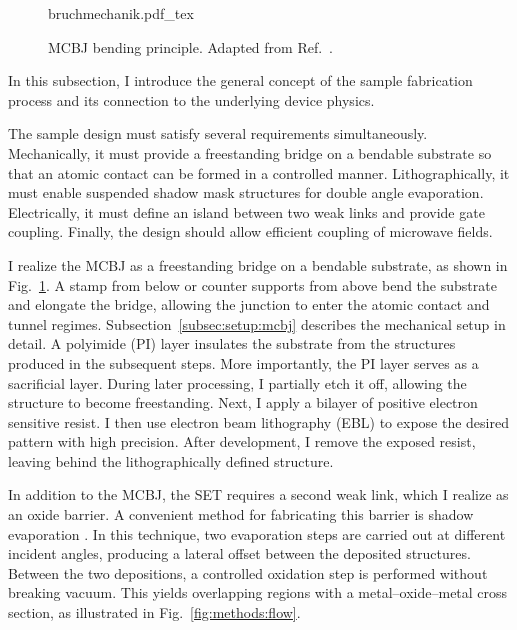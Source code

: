         \begin{figure}
            \captionsetup{format=plain}%
            \centering
            \vspace{-.75em}
            {bruchmechanik.pdf_tex}
            \vspace{-1.5em}
            \caption{
                MCBJ bending principle. Adapted from Ref.~\cite{schirm_einfluss_2009}.
            }
            \label{fig:methods:bruchmechanik}
        \end{figure}
        In this subsection, I introduce the general concept of the sample fabrication process and its connection to the underlying device physics.

        The sample design must satisfy several requirements simultaneously. Mechanically, it must provide a freestanding bridge on a bendable substrate so that an atomic contact can be formed in a controlled manner. Lithographically, it must enable suspended shadow mask structures for double angle evaporation. Electrically, it must define an island between two weak links and provide gate coupling. Finally, the design should allow efficient coupling of microwave fields.

        I realize the MCBJ as a freestanding bridge on a bendable substrate, as shown in Fig.~\ref{fig:methods:bruchmechanik}. A stamp from below or counter supports from above bend the substrate and elongate the bridge, allowing the junction to enter the atomic contact and tunnel regimes. Subsection~\ref{subsec:setup:mcbj} describes the mechanical setup in detail. A polyimide (PI) layer insulates the substrate from the structures produced in the subsequent steps. More importantly, the PI layer serves as a sacrificial layer. During later processing, I partially etch it off, allowing the structure to become freestanding. Next, I apply a bilayer of positive electron sensitive resist. I then use electron beam lithography (EBL) to expose the desired pattern with high precision. After development, I remove the exposed resist, leaving behind the lithographically defined structure.

        In addition to the MCBJ, the SET requires a second weak link, which I realize as an oxide barrier. A convenient method for fabricating this barrier is shadow evaporation \cite{niemeyer_observation_1976,dolan_offset_1977}. In this technique, two evaporation steps are carried out at different incident angles, producing a lateral offset between the deposited structures. Between the two depositions, a controlled oxidation step is performed without breaking vacuum. This yields overlapping regions with a metal--oxide--metal cross section, as illustrated in Fig.~\ref{fig:methods:flow}.

